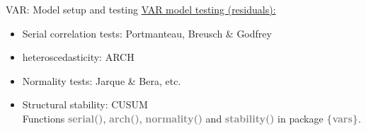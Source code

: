 \documentclass[usenames,dvipsnames]{beamer}
\begin{document}
\begin{frame}{VAR: Model setup and testing}
\underline{VAR model testing (residuals):}
\vspace*{4mm}
\begin{itemize}
\item Serial correlation tests: Portmanteau, Breusch \& Godfrey
\item heteroscedasticity: ARCH
\item Normality tests: Jarque \& Bera, etc.
\item Structural stability: CUSUM \\
\vspace{0.5cm}
Functions \textbf{\textcolor{Gray}{serial()}}, \textbf{\textcolor{Gray}{arch()}}, \textbf{\textcolor{Gray}{normality()}} and \textbf{\textcolor{Gray}{stability()}} in package \textbf{\textcolor{Gray}{\{vars\}}}.
\end{itemize}
\end{frame}
\end{document}
